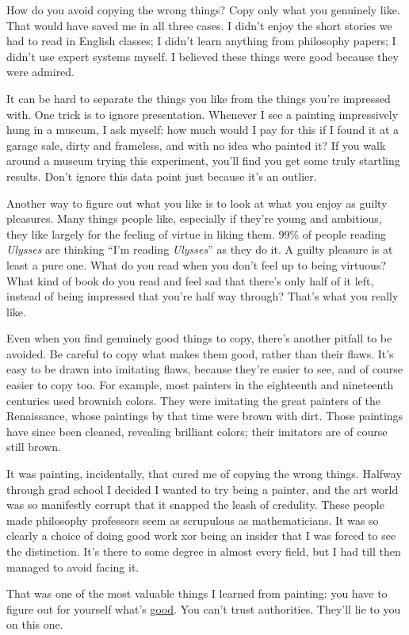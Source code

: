 How do you avoid copying the wrong things? Copy only what you genuinely
like. That would have saved me in all three cases. I didn't enjoy the
short stories we had to read in English classes; I didn't learn anything
from philosophy papers; I didn't use expert systems myself. I believed
these things were good because they were admired.

It can be hard to separate the things you like from the things you're
impressed with. One trick is to ignore presentation. Whenever I see a
painting impressively hung in a museum, I ask myself: how much would I
pay for this if I found it at a garage sale, dirty and frameless, and
with no idea who painted it? If you walk around a museum trying this
experiment, you'll find you get some truly startling results. Don't
ignore this data point just because it's an outlier.

Another way to figure out what you like is to look at what you enjoy as
guilty pleasures. Many things people like, especially if they're young
and ambitious, they like largely for the feeling of virtue in liking
them. 99\% of people reading \emph{Ulysses} are thinking ``I'm reading
\emph{Ulysses}'' as they do it. A guilty pleasure is at least a pure
one. What do you read when you don't feel up to being virtuous? What
kind of book do you read and feel sad that there's only half of it left,
instead of being impressed that you're half way through? That's what you
really like.

Even when you find genuinely good things to copy, there's another
pitfall to be avoided. Be careful to copy what makes them good, rather
than their flaws. It's easy to be drawn into imitating flaws, because
they're easier to see, and of course easier to copy too. For example,
most painters in the eighteenth and nineteenth centuries used brownish
colors. They were imitating the great painters of the Renaissance, whose
paintings by that time were brown with dirt. Those paintings have since
been cleaned, revealing brilliant colors; their imitators are of course
still brown.

It was painting, incidentally, that cured me of copying the wrong
things. Halfway through grad school I decided I wanted to try being a
painter, and the art world was so manifestly corrupt that it snapped the
leash of credulity. These people made philosophy professors seem as
scrupulous as mathematicians. It was so clearly a choice of doing good
work xor being an insider that I was forced to see the distinction. It's
there to some degree in almost every field, but I had till then managed
to avoid facing it.

That was one of the most valuable things I learned from painting: you
have to figure out for yourself what's \href{taste.html}{good}. You
can't trust authorities. They'll lie to you on this one.